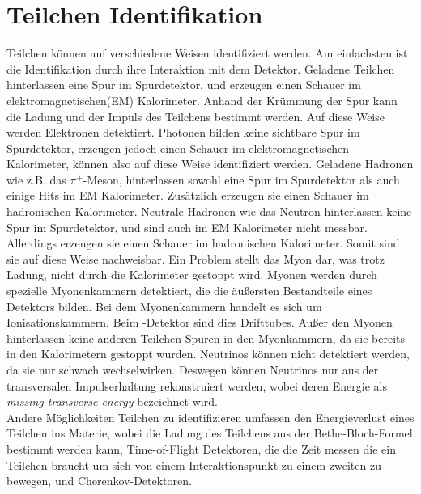 \section{Teilchen Identifikation}
Teilchen können auf verschiedene Weisen identifiziert werden. Am einfachsten ist die Identifikation durch ihre Interaktion mit dem Detektor. Geladene Teilchen hinterlassen eine Spur im Spurdetektor, und erzeugen einen Schauer im elektromagnetischen(EM) Kalorimeter. Anhand der Krümmung der Spur kann die Ladung und der Impuls des Teilchens bestimmt werden. Auf diese Weise werden Elektronen detektiert. Photonen bilden keine sichtbare Spur im Spurdetektor, erzeugen jedoch einen Schauer im elektromagnetischen Kalorimeter, können also auf diese Weise identifiziert werden. Geladene Hadronen wie z.B. das $\pi^+$-Meson, hinterlassen sowohl eine Spur im Spurdetektor als auch einige Hits im EM Kalorimeter. Zusätzlich erzeugen sie einen Schauer im hadronischen Kalorimeter. Neutrale Hadronen wie das Neutron hinterlassen keine Spur im Spurdetektor, und sind auch im EM Kalorimeter nicht messbar. Allerdings erzeugen sie einen Schauer im hadronischen Kalorimeter. Somit sind sie auf diese Weise nachweisbar. Ein Problem stellt das Myon dar, was trotz Ladung, nicht durch die Kalorimeter gestoppt wird. Myonen werden durch spezielle Myonenkammern detektiert, die die äußersten Bestandteile eines Detektors bilden. Bei dem Myonenkammern handelt es sich um Ionisationskammern. Beim \atlas-Detektor sind dies Drifttubes. Außer den Myonen hinterlassen keine anderen Teilchen Spuren in den Myonkammern, da sie bereits in den Kalorimetern gestoppt wurden.
Neutrinos können nicht detektiert werden, da sie nur schwach wechselwirken. Deswegen können Neutrinos nur aus der transversalen Impulserhaltung rekonstruiert werden, wobei deren Energie als \emph{missing transverse energy} \MET bezeichnet wird.\\ \noindent
Andere Möglichkeiten Teilchen zu identifizieren umfassen den Energieverlust eines Teilchen ins Materie, wobei die Ladung des Teilchens aus der Bethe-Bloch-Formel bestimmt werden kann, Time-of-Flight Detektoren, die die Zeit messen die ein Teilchen braucht um sich von einem Interaktionspunkt zu einem zweiten zu bewegen, und Cherenkov-Detektoren. 


